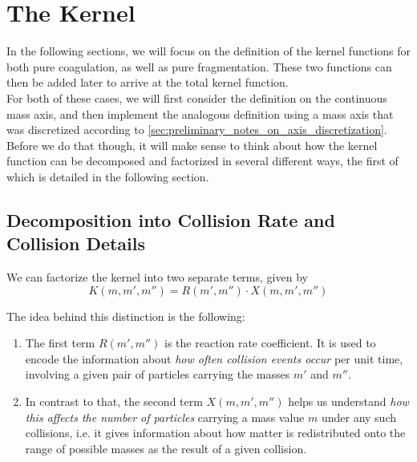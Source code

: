 \clearpage\section{The Kernel}
    
        In the following sections, we will focus on the definition of the kernel functions 
        for both pure coagulation, as well as pure fragmentation. These two functions can 
        then be added later to arrive at the total kernel function. \\

        For both of these cases, we will first consider the definition on the continuous 
        mass axis, and then implement the analogous definition using a mass axis 
        that was discretized according to \cref{sec:preliminary_notes_on_axis_discretization}. \\

        Before we do that though, it will make sense to think about how the kernel function can be 
        decomposed and factorized in several different ways, the first of which 
        is detailed in the following section. 


    \subsection{Decomposition into Collision Rate and Collision Details}
    
        We can factorize the kernel into two separate terms, given by
        \begin{equation}
            K(m, m', m'') = R(m', m'') \cdot X(m, m', m'') 
        \end{equation}
    
        The idea behind this distinction is the following: 
        \begin{enumerate}
    
            \item The first term $R(m',m'')$ is the reaction rate coefficient. It is used to 
                encode the information about \textit{how often collision events occur}
                per unit time, involving a given pair of particles carrying the masses $m'$ 
                and $m''$.
    
            \item In contrast to that, the second term $X(m,m',m'')$ helps us understand 
                \textit{how this affects the number of particles} carrying a mass value $m$ 
                under any such collisions, i.e. it gives information about how matter is 
                redistributed onto the range of possible masses as the result of a given 
                collision.
    
        \end{enumerate}
    
